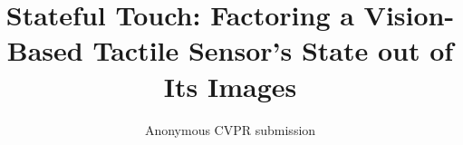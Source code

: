 \documentclass[10pt,twocolumn,letterpaper]{article}
\title{Stateful Touch: Factoring a Vision-Based Tactile Sensor's State out of Its Images}
\author{Anonymous CVPR submission} %
\begin{document}
\maketitle









{\small

}
\end{document}
